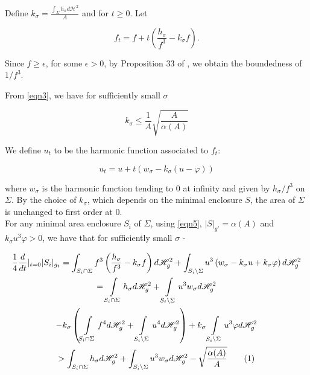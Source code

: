 \documentclass{amsart}
\newcommand{\hm}{\mathscr{H}}
\newcommand\numberthis{\addtocounter{equation}{1}\tag{\theequation}}
\theoremstyle{named}
\begin{document}
Define $k_{\sigma} = \frac{\int_{\Sigma}h_{\sigma}d\hm^{2}}{A}$ and for $t \geq 0$. Let

\begin{equation}
    f_t = f + t\left( \frac{h_{\sigma}}{f^3} - k_{\sigma}f \right).
\end{equation}

Since $f \geq \epsilon$, for some $\epsilon > 0$, by Proposition 33 of \cite{jeff}, we obtain the boundedness of $1 /f^3$.

From \eqref{eqn3}, we have for sufficiently small $\sigma$ 

\begin{equation}
\label{eqn5}
    k_{\sigma} \leq \frac{1}{A} \sqrt{\frac{A}{\alpha (A)}}
\end{equation}

We define $u_t$ to be the harmonic function associated to $f_t$:

\begin{equation}
    u_t = u + t (w_{\sigma} - k_{\sigma}(u-\varphi))
\end{equation}

where $w_{\sigma}$ is the harmonic function tending to 0 at infinity and given by $h_{\sigma}/f^3$ on $\Sigma$. By the choice of $k_{\sigma}$, which depends on the minimal enclosure $S$, the area of $\Sigma$ is unchanged to first order at 0.\\

For any minimal area enclosure $S_i$ of $\Sigma$, using \eqref{eqn5}, $|S|_{g'} = \alpha(A)$ and $k_{\sigma}u^3\varphi > 0$, we have that for sufficiently small $\sigma$ - 

\begin{gather*} 
\label{eqn7}
    \frac{1}{4}\frac{d}{dt}|_{t=0} |S_i|_{g_t} = \int_{S_i \cap \Sigma} f^3 \left( \frac{h_{\sigma}}{f^3} - k_{\sigma}f \right)d\hm^{2}_{g} + \int_{S_i \backslash \Sigma} u^3 \left( w_{\sigma} - k_{\sigma}u + k_{\sigma}\varphi \right)d\hm^2_g \\ 
    = \int\limits_{S_i \cap \Sigma} h_{\sigma}d\hm^2_g + \int\limits_{S_i \backslash \Sigma} u^3 w_{\sigma}d\hm^2_g \\ 
    - k_{\sigma} \left( \int\limits_{S_i \cap \Sigma} f^4 d\hm^2_g + \int\limits_{S_i \backslash \Sigma} u^4 d\hm^2_g \right) + k_{\sigma} \int\limits_{S_i \backslash \Sigma} u^3 \varphi d\hm^2_g  \\
    > \int_{S_i \cap \Sigma} h_{\sigma}d\hm^2_g + \int_{S_i \backslash \Sigma} u^3w_{\sigma}d\hm^2_g - \sqrt{\frac{\alpha (A) }{A}} \numberthis 
\end{gather*}
\end{document}
